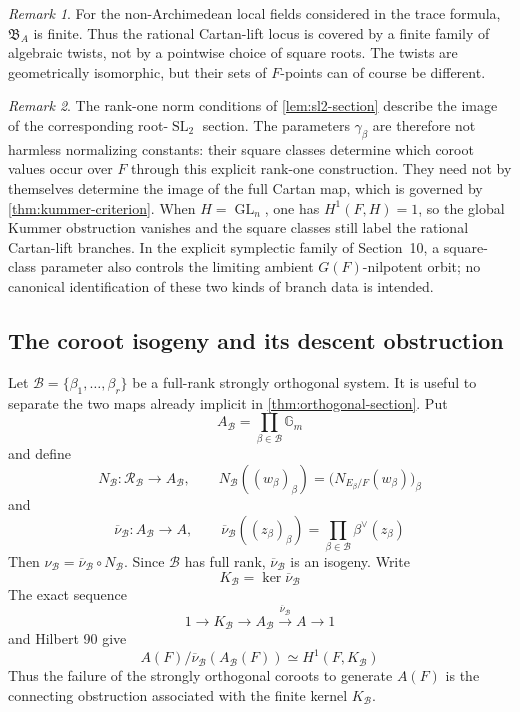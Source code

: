 \documentclass[11pt]{amsart}
\theoremstyle{definition}
\theoremstyle{remark}
\newtheorem{remark}[remark]{Remark}
\newcommand{\cB}{\mathcal B}
\newcommand{\Gm}{\mathbb G_m}
\newcommand{\GL}{\operatorname{GL}}
\newcommand{\SL}{\operatorname{SL}}
\begin{document}
\begin{remark}
For the non-Archimedean local fields considered in the trace formula,
$\mathfrak B_A$ is finite.  Thus the rational Cartan-lift locus is covered by
a finite family of algebraic twists, not by a pointwise choice of square
roots.  The twists are geometrically isomorphic, but their sets of $F$-points
can of course be different.
\end{remark}

\begin{remark}
The rank-one norm conditions of \cref{lem:sl2-section} describe the image of
the corresponding root-$\SL_2$ section.  The parameters $\gamma_\beta$ are
therefore not harmless normalizing constants: their square classes determine
which coroot values occur over $F$ through this explicit rank-one
construction.  They need not by themselves determine the image of the full
Cartan map, which is governed by \cref{thm:kummer-criterion}.  When
$H=\GL_n$, one has $H^1(F,H)=1$, so the global Kummer
obstruction vanishes and the square classes still label the rational
Cartan-lift branches.  In the explicit symplectic family of Section~10, a
square-class parameter also controls the limiting ambient $G(F)$-nilpotent
orbit; no canonical identification of these two kinds of branch data is
intended.
\end{remark}

\subsection{The coroot isogeny and its descent obstruction}
Let $\cB=\{\beta_1,\ldots,\beta_r\}$ be a full-rank strongly orthogonal
system.  It is useful to separate the two maps already implicit in
\cref{thm:orthogonal-section}.  Put
\[
 A_\cB=\prod_{\beta\in\cB}\Gm
\]
and define
\[
 N_\cB:\mathcal R_\cB\longrightarrow A_\cB,
 \qquad
 N_\cB((w_\beta)_\beta)
 =\bigl(N_{E_\beta/F}(w_\beta)\bigr)_\beta
\]
and
\[
 \overline\nu_\cB:A_\cB\longrightarrow A,
 \qquad
 \overline\nu_\cB((z_\beta)_\beta)
 =\prod_{\beta\in\cB}\beta^\vee(z_\beta)
\]
Then $\nu_\cB=\overline\nu_\cB\circ N_\cB$.  Since $\cB$ has full rank,
$\overline\nu_\cB$ is an isogeny.  Write
\[
 K_\cB=\ker\overline\nu_\cB
\]
The exact sequence
\[
 1\longrightarrow K_\cB\longrightarrow A_\cB
 \xrightarrow{\overline\nu_\cB}A\longrightarrow1
\]
and Hilbert 90 give
\[
 A(F)/\overline\nu_\cB(A_\cB(F))
 \simeq H^1(F,K_\cB)
\]
Thus the failure of the strongly orthogonal coroots to generate $A(F)$ is
the connecting obstruction associated with the finite kernel
$K_\cB$.
\end{document}
